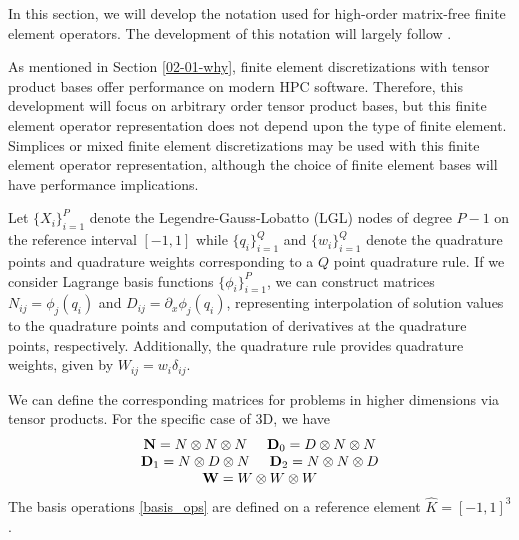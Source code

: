 In this section, we will develop the notation used for high-order matrix-free finite element operators.
The development of this notation will largely follow \cite{brown2010efficient}.

As mentioned in Section \ref{02-01-why}, finite element discretizations with tensor product bases offer performance on modern HPC software.
Therefore, this development will focus on arbitrary order tensor product bases, but this finite element operator representation does not depend upon the type of finite element.
Simplices or mixed finite element discretizations may be used with this finite element operator representation, although the choice of finite element bases will have performance implications.

Let $\lbrace X_i \rbrace_{i = 1}^P$ denote the Legendre-Gauss-Lobatto (LGL) nodes of degree $P - 1$ on the reference interval $\left[ -1, 1 \right]$ while $\lbrace q_i \rbrace_{i = 1}^Q$ and $\lbrace w_i \rbrace_{i = 1}^Q$ denote the quadrature points and quadrature weights corresponding to a $Q$ point quadrature rule.
If we consider Lagrange basis functions $\lbrace \phi_i \rbrace_{i = 1}^P$, we can construct matrices $N_{i j} = \phi_j \left( q_i \right)$ and $D_{i j} = \partial_x \phi_j \left( q_i \right)$, representing interpolation of solution values to the quadrature points and computation of derivatives at the quadrature points, respectively.
Additionally, the quadrature rule provides quadrature weights, given by $W_{i j} = w_i \delta_{i j}$.

We can define the corresponding matrices for problems in higher dimensions via tensor products.
For the specific case of 3D, we have
\begin{equation}
\begin{array}{c}
\mathbf{N}   = N \otimes N \otimes N \hspace{5mm}
\mathbf{D}_0 = D \otimes N \otimes N\\
\mathbf{D}_1 = N \otimes D \otimes N \hspace{5mm}
\mathbf{D}_2 = N \otimes N \otimes D\\
\mathbf{W}   = W \otimes W \otimes W
\end{array}
\label{basis_ops}
\end{equation}
The basis operations \ref{basis_ops} are defined on a reference element $\hat{K} = \left[ -1, 1 \right]^3$.


